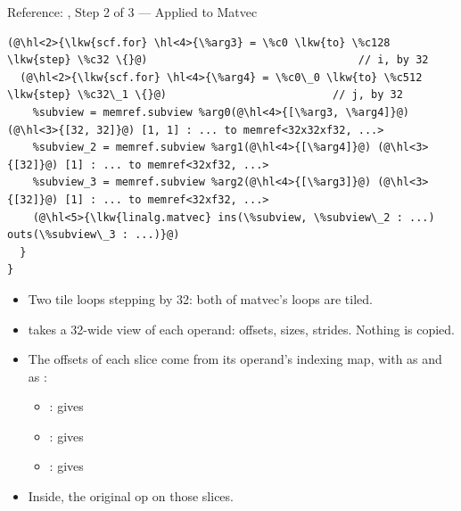 \documentclass[aspectratio=169,10pt]{beamer}
\begin{document}
\begin{frame}[fragile]{Reference: , Step 2 of 3 --- Applied to Matvec}
\begin{lstlisting}[language=mlir,basicstyle=\ttfamily\fontsize{6.6}{7.9}\selectfont]
(@\hl<2>{\lkw{scf.for} \hl<4>{\%arg3} = \%c0 \lkw{to} \%c128 \lkw{step} \%c32 \{}@)                                 // i, by 32
  (@\hl<2>{\lkw{scf.for} \hl<4>{\%arg4} = \%c0\_0 \lkw{to} \%c512 \lkw{step} \%c32\_1 \{}@)                          // j, by 32
    %subview = memref.subview %arg0(@\hl<4>{[\%arg3, \%arg4]}@) (@\hl<3>{[32, 32]}@) [1, 1] : ... to memref<32x32xf32, ...>
    %subview_2 = memref.subview %arg1(@\hl<4>{[\%arg4]}@) (@\hl<3>{[32]}@) [1] : ... to memref<32xf32, ...>
    %subview_3 = memref.subview %arg2(@\hl<4>{[\%arg3]}@) (@\hl<3>{[32]}@) [1] : ... to memref<32xf32, ...>
    (@\hl<5>{\lkw{linalg.matvec} ins(\%subview, \%subview\_2 : ...) outs(\%subview\_3 : ...)}@)
  }
}
\end{lstlisting}
  \vspace{0.4em}
  \begin{itemize}
    \item<2-> Two  tile loops stepping by 32: both of matvec's
      loops are tiled.
    \item<3->  takes a 32-wide \alert{view} of each
      operand: offsets, sizes, strides. Nothing is copied.
    \item<4-> The offsets of each slice come from its operand's indexing map,
      with  as  and  as :
      \begin{itemize}
        \item {}:  gives 
        \item {}:  gives \cd{[\%arg4]}
        \item {}:  gives \cd{[\%arg3]}
      \end{itemize}
    \item<5-> Inside, the original op on those slices.
  \end{itemize}
\end{frame}
\end{document}
